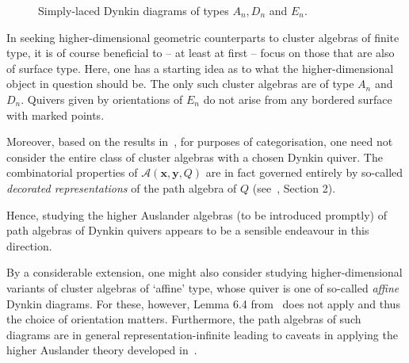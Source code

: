 \documentclass[a4paper,oneside,svgnames,draft]{amsart}
\theoremstyle{plain}
\theoremstyle{definition}
\begin{document}
\begin{figure}[ht]
\begin{subfigure}[b]{.6\textwidth}
  \end{subfigure}
  \caption{Simply-laced Dynkin diagrams of types $A_n,D_n$ and $E_n$.}
  \label{fig:dynkin-diagrams}
 \end{figure}

 In seeking higher-dimensional geometric counterparts to cluster algebras of
 finite type, it is of course beneficial to -- at least at first -- focus on
 those that are also of surface type. Here, one has a starting idea as to what
 the higher-dimensional object in question should be. The only such cluster
 algebras are of type $A_n$ and $D_n$.  Quivers given by orientations of $E_n$
 do not arise from any bordered surface with marked points.  

 Moreover, based on the results in~\cite{bma}, for purposes of categorisation,
 one need not consider the entire class of cluster algebras with a chosen Dynkin
 quiver. The combinatorial properties of $\mathcal{A}(\mathbf{x},\mathbf{y},Q)$
 are in fact governed entirely by so-called \emph{decorated representations} of
 the path algebra of $Q$ (see~\cite{bma}, Section 2).

 Hence, studying the higher Auslander algebras (to be introduced promptly) of
 path algebras of Dynkin quivers appears to be a sensible endeavour in this
 direction.

 By a considerable extension, one might also consider studying
 higher-dimensional variants of cluster algebras of `affine' type, whose quiver
 is one of so-called \emph{affine} Dynkin diagrams. For these, however, Lemma
 6.4 from~\cite{fst} does not apply and thus the choice of orientation matters.
 Furthermore, the path algebras of such diagrams are in general
 representation-infinite leading to caveats in applying the higher Auslander
 theory developed in~\cite{iyama}.
\end{document}
